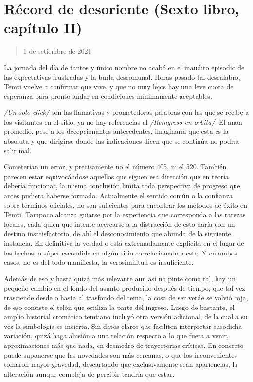 \documentclass[
]{book}
\begin{document}
\hypertarget{ruxe9cord-de-desoriente-sexto-libro-capuxedtulo-ii}{%
\section{Récord de desoriente (Sexto libro, capítulo II)}\label{ruxe9cord-de-desoriente-sexto-libro-capuxedtulo-ii}}

\begin{quote}
1 de setiembre de 2021
\end{quote}

La jornada del día de tantos y único nombre no acabó en el inaudito episodio de las expectativas frustradas y la burla descomunal. Horas pasado tal descalabro, Temti vuelve a confirmar que vive, y que no muy lejos hay una leve cuota de esperanza para pronto andar en condiciones mínimamente aceptables.

\emph{/Un solo click/} son las llamativas y prometedoras palabras con las que se recibe a los visitantes en el sitio, ya no hay referencias al \emph{/Reingreso en orbita/}. El anon promedio, pese a los decepcionantes antecedentes, imaginaría que esta es la absoluta y que dirigirse donde las indicaciones dicen que se continúa no podría salir mal.

Cometerían un error, y precisamente no el número 405, ni el 520. También parecen estar equivocándose aquellos que siguen esa dirección que en teoría debería funcionar, la misma conclusión limita toda perspectiva de progreso que antes pudiera haberse formado. Actualmente el sentido común o la confianza sobre términos oficiales, no son suficientes para encontrar los métodos de éxito en Temti. Tampoco alcanza guiarse por la experiencia que corresponda a las rarezas locales, cada quien que intente acercarse a la distracción de esto daría con un destino insatisfactorio, de ahí el desconocimiento que abunda de la siguiente instancia. En definitiva la verdad o está extremadamente explícita en el lugar de los hechos, o súper escondida en algún sitio correlacionado a este. Y en ambos casos, no es del todo manifiesta, la verosimilitud es insuficiente.

Además de eso y hasta quizá más relevante aun así no pinte como tal, hay un pequeño cambio en el fondo del asunto producido después de tiempo, que tal vez trasciende desde o hasta al trasfondo del tema, la cosa de ser verde se volvió roja, de eso consiste el telón que estiliza la parte del ingreso. Luego de bastante, el amplio historial cromático temtiano incluyó otra versión adicional, de la cual a su vez la simbología es incierta. Sin datos claros que faciliten interpretar susodicha variación, quizá haga alusión a una relación respecto a lo que fuera a venir, aproximaciones más que nada, en desmedro de trayectorias críticas. En concreto puede suponerse que las novedades son más cercanas, o que los inconvenientes tomaron mayor gravedad, descartando que exclusivamente sean apariencias, la alteración aunque compleja de percibir tendría que estar.
\end{document}
